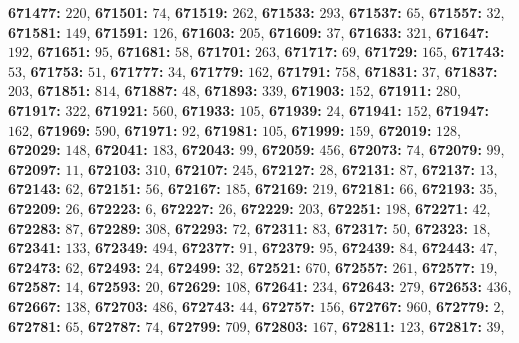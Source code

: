 \textsf{\bfseries 671477:} $220$, \textsf{\bfseries 671501:} $74$, \textsf{\bfseries 671519:} $262$, \textsf{\bfseries 671533:} $293$, \textsf{\bfseries 671537:} $65$, \textsf{\bfseries 671557:} $32$, \textsf{\bfseries 671581:} $149$, \textsf{\bfseries 671591:} $126$, \textsf{\bfseries 671603:} $205$, \textsf{\bfseries 671609:} $37$, \textsf{\bfseries 671633:} $321$, \textsf{\bfseries 671647:} $192$, \textsf{\bfseries 671651:} $95$, \textsf{\bfseries 671681:} $58$, \textsf{\bfseries 671701:} $263$, \textsf{\bfseries 671717:} $69$, \textsf{\bfseries 671729:} $165$, \textsf{\bfseries 671743:} $53$, \textsf{\bfseries 671753:} $51$, \textsf{\bfseries 671777:} $34$, \textsf{\bfseries 671779:} $162$, \textsf{\bfseries 671791:} $758$, \textsf{\bfseries 671831:} $37$, \textsf{\bfseries 671837:} $203$, \textsf{\bfseries 671851:} $814$, \textsf{\bfseries 671887:} $48$, \textsf{\bfseries 671893:} $339$, \textsf{\bfseries 671903:} $152$, \textsf{\bfseries 671911:} $280$, \textsf{\bfseries 671917:} $322$, \textsf{\bfseries 671921:} $560$, \textsf{\bfseries 671933:} $105$, \textsf{\bfseries 671939:} $24$, \textsf{\bfseries 671941:} $152$, \textsf{\bfseries 671947:} $162$, \textsf{\bfseries 671969:} $590$, \textsf{\bfseries 671971:} $92$, \textsf{\bfseries 671981:} $105$, \textsf{\bfseries 671999:} $159$, \textsf{\bfseries 672019:} $128$, \textsf{\bfseries 672029:} $148$, \textsf{\bfseries 672041:} $183$, \textsf{\bfseries 672043:} $99$, \textsf{\bfseries 672059:} $456$, \textsf{\bfseries 672073:} $74$, \textsf{\bfseries 672079:} $99$, \textsf{\bfseries 672097:} $11$, \textsf{\bfseries 672103:} $310$, \textsf{\bfseries 672107:} $245$, \textsf{\bfseries 672127:} $28$, \textsf{\bfseries 672131:} $87$, \textsf{\bfseries 672137:} $13$, \textsf{\bfseries 672143:} $62$, \textsf{\bfseries 672151:} $56$, \textsf{\bfseries 672167:} $185$, \textsf{\bfseries 672169:} $219$, \textsf{\bfseries 672181:} $66$, \textsf{\bfseries 672193:} $35$, \textsf{\bfseries 672209:} $26$, \textsf{\bfseries 672223:} $6$, \textsf{\bfseries 672227:} $26$, \textsf{\bfseries 672229:} $203$, \textsf{\bfseries 672251:} $198$, \textsf{\bfseries 672271:} $42$, \textsf{\bfseries 672283:} $87$, \textsf{\bfseries 672289:} $308$, \textsf{\bfseries 672293:} $72$, \textsf{\bfseries 672311:} $83$, \textsf{\bfseries 672317:} $50$, \textsf{\bfseries 672323:} $18$, \textsf{\bfseries 672341:} $133$, \textsf{\bfseries 672349:} $494$, \textsf{\bfseries 672377:} $91$, \textsf{\bfseries 672379:} $95$, \textsf{\bfseries 672439:} $84$, \textsf{\bfseries 672443:} $47$, \textsf{\bfseries 672473:} $62$, \textsf{\bfseries 672493:} $24$, \textsf{\bfseries 672499:} $32$, \textsf{\bfseries 672521:} $670$, \textsf{\bfseries 672557:} $261$, \textsf{\bfseries 672577:} $19$, \textsf{\bfseries 672587:} $14$, \textsf{\bfseries 672593:} $20$, \textsf{\bfseries 672629:} $108$, \textsf{\bfseries 672641:} $234$, \textsf{\bfseries 672643:} $279$, \textsf{\bfseries 672653:} $436$, \textsf{\bfseries 672667:} $138$, \textsf{\bfseries 672703:} $486$, \textsf{\bfseries 672743:} $44$, \textsf{\bfseries 672757:} $156$, \textsf{\bfseries 672767:} $960$, \textsf{\bfseries 672779:} $2$, \textsf{\bfseries 672781:} $65$, \textsf{\bfseries 672787:} $74$, \textsf{\bfseries 672799:} $709$, \textsf{\bfseries 672803:} $167$, \textsf{\bfseries 672811:} $123$, \textsf{\bfseries 672817:} $39$, 
